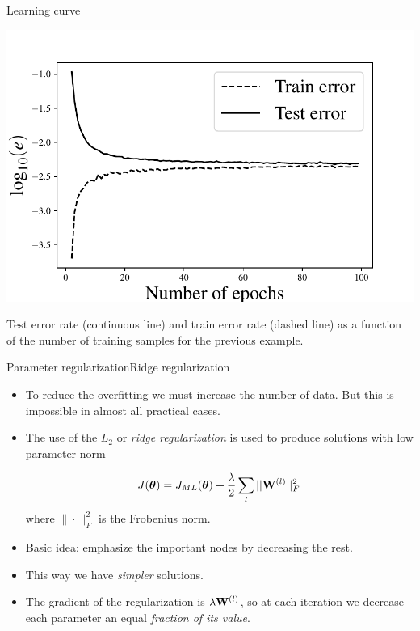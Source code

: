 \documentclass{beamer}
\begin{document}
\begin{frame}{Learning curve}

\begin{center}
    \includegraphics[scale=0.38]{Module 1 (NN)/pics/example_161_train_test_error100_.pdf}
    \end{center}
    
    Test error rate (continuous line) and train error rate (dashed line) as a function of the number of training samples for the previous  example.
\end{frame}

\begin{frame}{Parameter regularization}{Ridge regularization}
\begin{itemize}
    \item To reduce the overfitting we must increase the number of data. But this is impossible in almost all practical cases.
    \item The use of the $L_2$ or \emph{ridge regularization} is used to produce solutions with low parameter norm
    
    \begin{equation}\label{eq:reg_cross_entropy}
J(\boldsymbol \theta) = J_{ML}(\boldsymbol \theta) + \frac{\lambda}{2} \sum_{l} ||{\bf W}^{(l)}||_F^2
\end{equation}
where $\|\cdot \|^2_F$ is the Frobenius norm.
  
        \item Basic idea: emphasize the important nodes by decreasing the rest.
        \item This way we have \emph{simpler} solutions.
\item The gradient of the regularization is $\lambda {\bf W}^{(l)}$, so at each iteration we decrease each parameter an equal \emph{fraction of its value}.
\end{itemize}
\end{frame}
\end{document}
